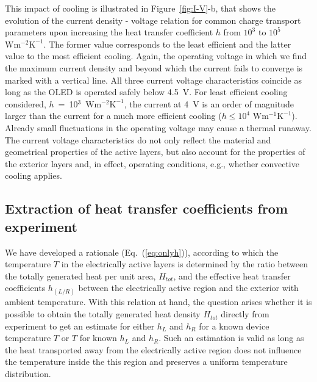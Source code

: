 \documentclass[%
9pt,
 aip,
rsi,%
 amsmath,amssymb,
preprint,%
]{revtex4-1}
\newcommand{\thermalconductivity}{$\mathrm{W m^{-1} K^{-1}}$}
\newcommand{\hcoefficient}{$\mathrm{W m^{-2} K^{-1}}$}
\begin{document}
This impact of cooling is illustrated in Figure~\ref{fig:I-V}-b, that shows the evolution of the current density - voltage relation for common charge transport parameters upon increasing the heat transfer coefficient $h$ from $10^3$ to $10^5$ \hcoefficient. 
The former value corresponds to the least efficient and the latter value to the most efficient cooling.
Again, the operating voltage in which we find the maximum current density and beyond which the current fails to converge is marked with a vertical line. 
All three current voltage characteristics coincide as long as the OLED is operated safely below 4.5~V.
%
For least efficient cooling considered, $h$~=~10$^3$~\hcoefficient, the current at 4~V is an order of magnitude larger than the current for a much more efficient cooling ($h \leq 10^4$ \thermalconductivity). Already small fluctuations in the operating voltage may cause a thermal runaway.
The current voltage characteristics do not only reflect the material and geometrical properties of the active layers, but also account for the properties of the exterior layers and, in effect, operating conditions, e.g., whether convective cooling applies.


\subsection{Extraction of heat transfer coefficients from experiment}

We have developed a rationale (Eq.~(\ref{eq:onlyh})), according to which the temperature $T$ in the electrically active layers is determined by the ratio between the totally generated heat per unit area, $H_{tot}$, and the effective heat transfer coefficients $h_{(L/R)}$ between the electrically active region and the exterior with ambient temperature. 
With this relation at hand, the question arises whether it is possible to obtain the totally generated heat density $H_{tot}$ directly from experiment to get an estimate for either $h_L$ and $h_R$ for a known device temperature $T$ or $T$ for known $h_L$ and $h_R$.
Such an estimation is valid as long as the heat transported away from the electrically active region does not influence the temperature inside the this region and preserves a uniform temperature distribution. 
\end{document}
